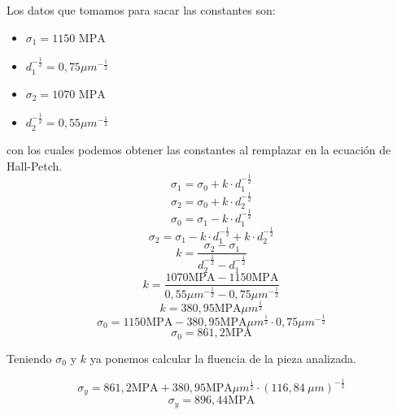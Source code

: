 \documentclass[12pt,a4paper]{article}
\begin{document}
Los datos que tomamos para sacar las constantes son:
\begin{itemize}
    \item\(\sigma_1=1150\text{ MPA}\)
    \item\(d^{-\frac{1}{2}}_1=0,75\mu m^{-\frac{1}{2}}\)
    \item\(\sigma_2=1070\text{ MPA}\)
    \item\(d^{-\frac{1}{2}}_2=0,55\mu m^{-\frac{1}{2}}\)
\end{itemize}

con los cuales podemos obtener las constantes al remplazar en la ecuación de Hall-Petch.
\begin{equation}
    \sigma_1 = \sigma_0 +k\cdot d^{-\frac{1}{2}}_1
\end{equation}
\begin{equation}
    \sigma_2 = \sigma_0 +k\cdot d^{-\frac{1}{2}}_2
\end{equation}
\begin{equation}
    \sigma_0 = \sigma_1 -k\cdot d^{-\frac{1}{2}}_1
\end{equation}
\begin{equation}
    \sigma_2 = \sigma_1 -k\cdot d^{-\frac{1}{2}}_1 +k\cdot d^{-\frac{1}{2}}_2
\end{equation}
\begin{equation}
    k = \frac{\sigma_2 - \sigma_1}{d^{-\frac{1}{2}}_2 - d^{-\frac{1}{2}}_1 }
\end{equation}
\begin{equation}
    k = \frac{1070 \text{MPA} - 1150 \text{MPA}}{0,55\mu m^{-\frac{1}{2}} - 0,75\mu m^{-\frac{1}{2}}}
\end{equation}
\begin{equation}
    k = 380,95 \text{MPA}\mu m^{\frac{1}{2}}
\end{equation}
\begin{equation}
    \sigma_0 = 1150 \text{MPA} - 380,95 \text{MPA}\mu m^{\frac{1}{2}}\cdot 0,75\mu m^{-\frac{1}{2}}
\end{equation}
\begin{equation}
    \sigma_0 = 861,2 \text{MPA} 
\end{equation}

Teniendo $\sigma_0$ y $k$ ya ponemos calcular la fluencia de la pieza analizada.

\begin{equation}
    \sigma_y = 861,2 \text{MPA} + 380,95 \text{MPA}\mu m^{\frac{1}{2}}\cdot (116,84\: \mu m)^{-\frac{1}{2}}
\end{equation}
\begin{equation}
    \sigma_y = 896,44 \text{MPA} 
\end{equation}
\end{document}
